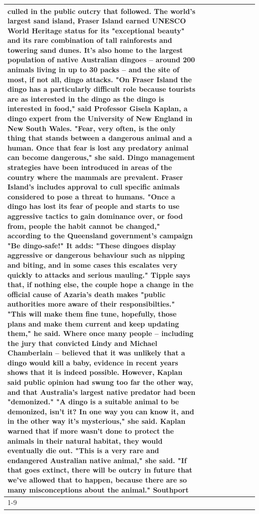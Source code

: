 \begin{table}[H]
\begin{tabular}{lllrlllll}
culled in the public outcry that followed. The world's largest sand island, Fraser Island earned UNESCO World Heritage status for its "exceptional beauty" and its rare combination of tall rainforests and towering sand dunes. It's also home to the largest population of native Australian dingoes -- around 200 animals living in up to 30 packs -- and the site of most, if not all, dingo attacks. "On Fraser Island the dingo has a particularly difficult role because tourists are as interested in the dingo as the dingo is interested in food," said Professor Gisela Kaplan, a dingo expert from the University of New England in New South Wales. "Fear, very often, is the only thing that stands between a dangerous animal and a human. Once that fear is lost any predatory animal can become dangerous," she said. Dingo management strategies have been introduced in areas of the country where the mammals are prevalent. Fraser Island's includes approval to cull specific animals considered to pose a threat to humans. "Once a dingo has lost its fear of people and starts to use aggressive tactics to gain dominance over, or food from, people the habit cannot be changed," according to the Queensland government's campaign "Be dingo-safe!" It adds: "These dingoes display aggressive or dangerous behaviour such as nipping and biting, and in some cases this escalates very quickly to attacks and serious mauling." Tipple says that, if nothing else, the couple hope a change in the official cause of Azaria's death makes "public authorities more aware of their responsibilties." "This will make them fine tune, hopefully, those plans and make them current and keep updating them," he said. Where once many people -- including the jury that convicted Lindy and Michael Chamberlain -- believed that it was unlikely that a dingo would kill a baby, evidence in recent years shows that it is indeed possible. However, Kaplan said public opinion had swung too far the other way, and that Australia's largest native predator had been "demonized." "A dingo is a suitable animal to be demonized, isn't it? In one way you can know it, and in the other way it's mysterious," she said. Kaplan warned that if more wasn't done to protect the animals in their natural habitat, they would eventually die out. "This is a very rare and endangered Australian native animal," she said. "If that goes extinct, there will be outcry in future that we've allowed that to happen, because there are so many misconceptions about the animal." Southport \\
\cline{1-9}

\end{tabular}
\end{table}
